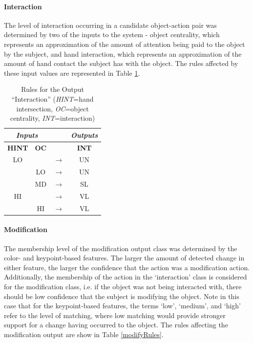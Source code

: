 \documentclass[12pt]{report}
\begin{document}
\paragraph{Interaction}
The level of interaction occurring in a candidate object-action pair was determined by two of the inputs to the system - object centrality, which represents an approximation of the amount of attention being paid to the object by the subject, and hand interaction, which represents an approximation of the amount of hand contact the subject has with the object. The rules affected by these input values are represented in Table \ref{interactRules}.

\begin{table}
\caption{Rules for the Output ``Interaction'' (\textit{HINT}=hand intersection, \textit{OC}=object centrality, \textit{INT}=interaction)}
\begin{center}
\begin{tabular}{cccc}
\hline
\multicolumn{2}{c}{\textbf{\textit{Inputs}}}& &\textbf{\textit{Outputs}} \\
\hline
\hline
\textbf{HINT} & \textbf{OC} & & \textbf{INT}\\
\hline
 LO & & $\longrightarrow$ & UN \\
 & LO & $\longrightarrow$ & UN \\
 & MD & $\longrightarrow$ & SL \\
 HI & & $\longrightarrow$ & VL \\
  & HI & $\longrightarrow$ & VL \\
\hline
\end{tabular}
\label{interactRules}
\end{center}
\end{table}

\paragraph{Modification}
The membership level of the modification output class was determined by the color- and keypoint-based features. The larger the amount of detected change in either feature, the larger the confidence that the action was a modification action. Additionally, the membership of the action in the `interaction' class is considered for the modification class, i.e. if the object was not being interacted with, there should be low confidence that the subject is modifying the object. Note in this case that for the keypoint-based features, the terms `low', `medium', and `high' refer to the level of matching, where low matching would provide stronger support for a change having occurred to the object. The rules affecting the modification output are show in Table \ref{modifyRules}.
\end{document}
